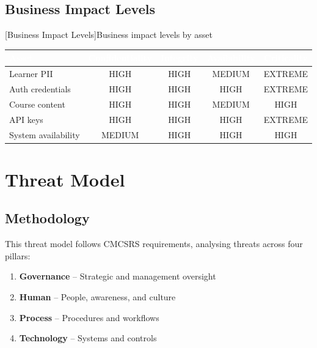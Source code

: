 \subsection{Business Impact Levels}
\begin{center}
[Business Impact Levels]{Business impact levels by asset}
\label{tab:business-impact}
\begin{tabular}{|l|c|c|c|c|}
\hline
\rowcolor{mooveblue}
\textcolor{white}{\textbf{Asset}} & \textcolor{white}{\textbf{Confidentiality}} & \textcolor{white}{\textbf{Integrity}} & \textcolor{white}{\textbf{Availability}} & \textcolor{white}{\textbf{Criticality}} \\
\hline
Learner PII & HIGH & HIGH & MEDIUM & EXTREME \\
Auth credentials & HIGH & HIGH & HIGH & EXTREME \\
Course content & HIGH & HIGH & MEDIUM & HIGH \\
API keys & HIGH & HIGH & HIGH & EXTREME \\
System availability & MEDIUM & HIGH & HIGH & HIGH \\
\hline
\end{tabular}
\end{center}

\section{Threat Model}

\subsection{Methodology}
This threat model follows CMCSRS requirements, analysing threats across four pillars:
\begin{enumerate}
    \item \textbf{Governance} – Strategic and management oversight
    \item \textbf{Human} – People, awareness, and culture
    \item \textbf{Process} – Procedures and workflows
    \item \textbf{Technology} – Systems and controls
\end{enumerate}

